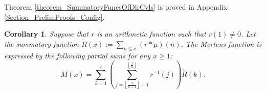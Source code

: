 \documentclass[11pt,reqno,a4letter]{article}
\newcommand{\hlocalref}[1]{\hyperref[#1]{\ref{#1}}}
\numberwithin{equation}{section}
\numberwithin{figure}{section}
\numberwithin{table}{section}
\newcommand{\floor}[1]{\left\lfloor #1 \right\rfloor}
\theoremstyle{plain}
\newtheorem{cor}[theorem]{Corollary}
\numberwithin{theorem}{section}
\theoremstyle{definition}
\begin{document}
Theorem \hlocalref{theorem_SummatoryFuncsOfDirCvls} 
is proved in Appendix \hlocalref{Section_PrelimProofs_Config}. 

\begin{cor} 
\label{cor_CvlGAstMu} 
Suppose that $r$ is an arithmetic function such that 
$r(1) \neq 0$. Let the summatory function 
$\widetilde{R}(x) := \sum_{n \leq x} (r \ast \mu)(n)$. 
The Mertens function is expressed by the following 
partial sums for any $x \geq 1$: 
\[
M(x) = \sum_{k=1}^{x} \left(\sum_{j=\floor{\frac{x}{k+1}}+1}^{\floor{\frac{x}{k}}} r^{-1}(j)\right) 
     \widetilde{R}(k). 
\]
\end{cor} 

\begin{figure}[ht!]

\captionsetup{singlelinecheck=off}
\centering

\begin{subfigure}[t!]{0.9\textwidth}
\captionsetup{justification=centering}
\caption{}
\end{subfigure}

\smallskip

\begin{subfigure}[t!]{0.9\textwidth}
\captionsetup{justification=centering}
\caption{}
\end{subfigure}

\captionsetup{justification=centering}
\caption{} 
\label{figure_MxAndNewAuxPartialSums_Comparison_Intro_v2_v1} 

\end{figure} 
\end{document}
